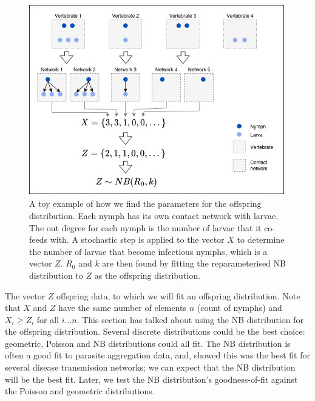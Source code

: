 \documentclass[hidelinks]{article}
\begin{document}
\begin{figure}[ht]
	\begin{mdframed}[backgroundcolor=grey250,rightline=false,leftline=false,topline=false]
	\includegraphics[width=1\textwidth, center]{coaggregation_data_diagram_mk3.drawio.png}
	\caption{A toy example of how we find the parameters for the offspring distribution. Each nymph has its own contact network with larvae. The out degree for each nymph is the number of larvae that it co-feeds with. A stochastic step is applied to the vector $ X $ to determine the number of larvae that become infectious nymphs, which is a vector $ Z $. $ R_0 $ and $ k $ are then found by fitting the reparameterised NB distribution to $ Z $ as the offspring distribution.}
	\label{fig:coaggregation_diagram}
	\end{mdframed}
\end{figure}

The vector $ Z $ offspring data, to which we will fit an offspring distribution. Note that $ X $ and $ Z $ have the same number of elements $ n $ (count of nymphs) and $ X_i \ge Z_i $ for all $ i...n $. 
This section has talked about using the NB distribution for the offspring distribution. Several discrete distributions could be the best choice: geometric, Poisson and NB distributions could all fit. The NB distribution is often a good fit to parasite aggregation data, and, \citet{LloydSmith2005} showed this was the best fit for several disease transmission networks; we can expect that the NB distribution will be the best fit. Later, we test the NB distribution's goodness-of-fit against the Poisson and geometric distributions.
\end{document}
